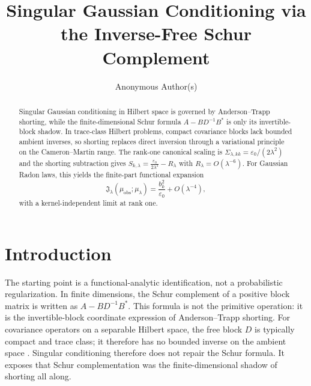 \documentclass[11pt]{amsart}
\title{Singular Gaussian Conditioning via the Inverse-Free Schur Complement}
\author{Anonymous Author(s)}
\theoremstyle{plain}
\theoremstyle{definition}
\theoremstyle{remark}
\begin{document}
\begin{abstract}
        Singular Gaussian conditioning in Hilbert space is governed by
        Anderson--Trapp shorting, while the finite-dimensional Schur formula
        $A-BD^{-1}B^*$ is only its invertible-block shadow.  In trace-class
        Hilbert problems, compact covariance blocks lack bounded ambient inverses,
        so shorting replaces direct inversion through a variational principle on
        the Cameron--Martin range.  The rank-one canonical scaling is
        $\Sigma_{\lambda,kk}=\varepsilon_0/(2\lambda^2)$ and the shorting
        subtraction gives $S_{k,\lambda}=\frac{\varepsilon_0}{2\lambda^2}-R_\lambda$
        with $R_\lambda=O(\lambda^{-6})$.
        For Gaussian Radon laws, this yields the finite-part functional expansion
        \[
        \mathfrak{J}_\lambda(\mu_{\mathrm{obs}};\mu_\lambda)
        =
        \frac{b_k^2}{\varepsilon_0}+O(\lambda^{-4}),
        \]
        with a kernel-independent limit at rank one.
    \end{abstract}


    \maketitle

    \section{Introduction}
    \label{sec:intro}

    The starting point is a functional-analytic identification, not a
    probabilistic regularization.  In finite dimensions, the Schur complement
    of a positive block matrix is written as $A-BD^{-1}B^*$.  This formula is
    not the primitive operation: it is the invertible-block coordinate
    expression of Anderson--Trapp shorting.  For covariance operators on a
    separable Hilbert space, the free block $D$ is typically compact and trace
    class; it therefore has no bounded inverse on the ambient space
    \cite{bogachev1998gaussian,simon2005trace,daprato2014stochastic,jorgensentian2024hilbert}.  Singular
    conditioning therefore does not repair the Schur formula.  It exposes that
    Schur complementation was the finite-dimensional shadow of shorting all
    along.
\end{document}
